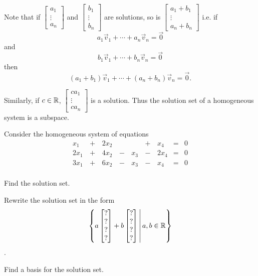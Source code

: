 \begin{applicationActivities}
\begin{definition}
\vspace{1em}
Note that if \(\begin{bmatrix} a_1 \\ \vdots \\ a_n \end{bmatrix} \) and \(\begin{bmatrix} b_1 \\ \vdots \\ b_n \end{bmatrix} \) are solutions, so is  \(\begin{bmatrix} a_1 +b_1\\ \vdots \\ a_n+b_n \end{bmatrix} \)  i.e. if
\[a_1 \vec{v}_1+\cdots+a_n \vec{v}_n = \vec{0} \]
and
\[b_1 \vec{v}_1+\cdots+b_n \vec{v}_n = \vec{0} \]
then
\[(a_1 + b_1) \vec{v}_1+\cdots+(a_n+b_n) \vec{v}_n = \vec{0} .\]

Similarly, if \(c \in \mathbb{R}\), \(\begin{bmatrix} ca_1 \\ \vdots \\ ca_n \end{bmatrix} \) is a solution.
\vspace{1em}
Thus the solution set of a homogeneous system is a subspace.
\end{definition}

\begin{activity}{10}
Consider the homogeneous system of equations 
\begin{alignat*}{5}
x_1&\,+\,&2x_2&\,\,& &\,+\,& x_4 &=& 0 \\
2x_1&\,+\,&4x_2&\,-\,&x_3 &\,-\,&2 x_4 &=& 0 \\
3x_1&\,+\,&6x_2&\,-\,&x_3 &\,-\,& x_4 &=& 0 \\
\end{alignat*}
\begin{subactivity}
Find the solution set.
\end{subactivity}
\begin{subactivity}
Rewrite the solution set in the form \[\left\{ a \begin{bmatrix} ? \\ ? \\ ? \\ ?\end{bmatrix} + b \begin{bmatrix} ? \\ ? \\ ? \\ ? \end{bmatrix} \,\middle|\,a,b \in \mathbb{R}\right\}\].
\end{subactivity}
\begin{subactivity}
Find a basis for the solution set.
\end{subactivity}
\end{activity}


\end{applicationActivities}
